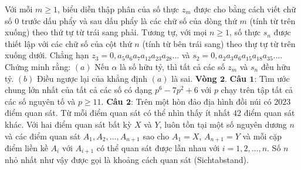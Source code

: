 \begin{multicols}{2}
\begin{figure}[H]
		\vspace*{-5pt}
	\end{figure}
	Với mỗi $m \ge 1$, biểu diễn thập phân của số thực $z_m$ được cho bằng cách viết chữ số 0 trước dấu phẩy và sau dấu phẩy là các chữ số của dòng thứ $m$ (tính từ trên xuống) theo thứ tự từ trái sang phải. Tương tự, với mọi $n \ge 1$, số thực $s_n$ được thiết lập với các chữ số của cột thứ $n$ (tính từ bên trái sang) theo thự tự từ trên xuống dưới. Chẳng hạn $z_3 = 0, a_5a_6a_7a_{12}a_{23}a_{28}\ldots$ và $s_2 = 0,a_2a_3a_6a_{15}a_{18}a_{35}\ldots$. Chứng minh rằng:
	\vskip 0.1cm
	$(a)$ Nếu $\alpha$ là số hữu tỷ, thì tất cả các số $z_m$ và $s_n$ đều hữu tỷ.
	\vskip 0.1cm
	$(b)$ Điều ngược lại của khẳng định $(a)$ là sai.
	\vskip 0.1cm
	\textbf{\color{cackithi}Vòng $\pmb{2.}$}
	\vskip 0.1cm
	\textbf{\color{cackithi}Câu $\pmb{1}$}: Tìm ước chung lớn nhất của tất cả các số có dạng $p^6 - 7p^2 +6$ với $p$ chạy trên tập tất cả các số nguyên tố và $p \ge 11$.
	\vskip 0.1cm
	\textbf{\color{cackithi}Câu $\pmb{2}$}: Trên một hòn đảo địa hình đồi núi có $2023$ điểm quan sát. Từ mỗi điểm quan sát có thể nhìn thấy ít nhất $42$ điểm quan sát khác. Với hai điểm quan sát bất kỳ $X$ và $Y$, luôn tồn tại một số nguyên dương $n$ và các điểm quan sát $A_1,  A_2, \ldots, A_{n+1}$ sao cho $A_1 = X$, $A_{n+1} = Y$ và mỗi cặp điểm liền kề $A_i$ với $A_{i+1}$ có thể quan sát được lẫn nhau với $i = 1, 2, \ldots, n$. Số $n$ nhỏ nhất như vậy được gọi là khoảng cách quan sát (Sichtabstand). 

\end{multicols}
